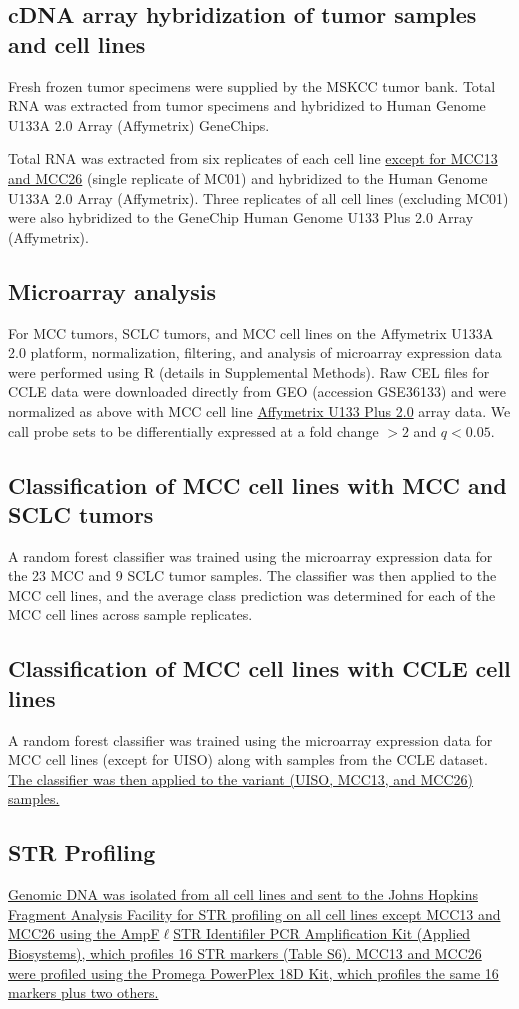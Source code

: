 \documentclass[10pt]{article}
\begin{document}
\subsection*{cDNA array hybridization of tumor samples and cell lines}
Fresh frozen tumor specimens were supplied by the MSKCC tumor bank.
Total RNA was extracted from tumor specimens and hybridized to Human Genome U133A 2.0 Array (Affymetrix) GeneChips.

Total RNA was extracted from six replicates of each cell line \uline{except for MCC13 and MCC26} (single replicate of MC01) and hybridized to the Human Genome U133A 2.0 Array (Affymetrix).
Three replicates of all cell lines (excluding MC01) were also hybridized to the GeneChip Human Genome U133 Plus 2.0 Array (Affymetrix).

\subsection*{Microarray analysis}
For MCC tumors, SCLC tumors, and MCC cell lines on the Affymetrix U133A 2.0 platform, normalization, filtering, and analysis of microarray expression data were performed using R (details in Supplemental Methods).
Raw CEL files for CCLE data were downloaded directly from GEO (accession GSE36133) and were normalized as above with MCC cell line \uline{Affymetrix U133 Plus 2.0} array data.
We call probe sets to be differentially expressed at a fold change $> 2$ and $q < 0.05$.

\subsection*{Classification of MCC cell lines with MCC and SCLC tumors}
A random forest classifier was trained using the microarray expression data for the 23 MCC and 9 SCLC tumor samples.
The classifier was then applied to the MCC cell lines, and the average class prediction was determined for each of the MCC cell lines across sample replicates.

\subsection*{Classification of MCC cell lines with CCLE cell lines}
A random forest classifier was trained using the  microarray expression data for MCC cell lines (except for UISO) along with samples from the CCLE dataset.
\uline{The classifier was then applied to the variant (UISO, MCC13, and MCC26) samples.}

\subsection*{STR Profiling}
\uline{Genomic DNA was isolated from all cell lines and sent to the Johns Hopkins Fragment Analysis Facility for STR profiling on all cell lines except MCC13 and MCC26 using the AmpF$\ell$STR Identifiler PCR Amplification Kit (Applied Biosystems), which profiles 16 STR markers (Table S6). MCC13 and MCC26 were profiled using the Promega PowerPlex 18D Kit, which profiles the same 16 markers plus two others.}
\end{document}
